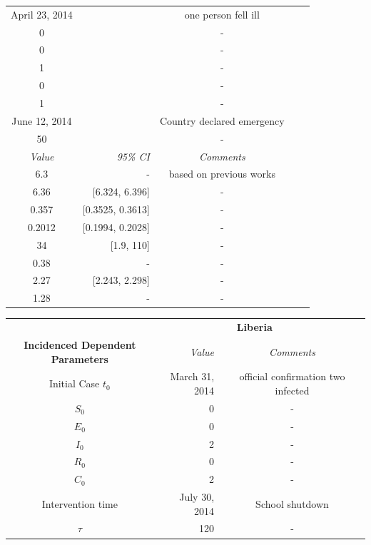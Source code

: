 \documentclass[10pt, journal,onecolumn]{IEEEtran}
\newcommand{\ra}[1]{\renewcommand{\arraystretch}{#1}}
\begin{document}
\begin{appendix}
\begin{table}[h]
{\begin{tabular}{@{}crccc@{}}
\cmidrule{1-3}
April 23, 2014 &  & one person fell ill \cite{}\\
0& & -\\
0& & -\\
1& & -\\
0& & -\\
1& &-\\
June 12, 2014 &  & Country declared emergency\\
50 & & -\\
\cmidrule{1-3}
\textit{Value} & \textit{95\% CI} & \textit{Comments} \\
\midrule
6.3 & - & based on previous works \cite{}\\
6.36 & [6.324, 6.396] & -\\
0.357 & [0.3525, 0.3613] & -\\
0.2012 & [0.1994, 0.2028] & -\\
34 & [1.9, 110] & -\\
0.38 & - & -\\
2.27 &[2.243, 2.298] &-\\
1.28 & - &-\\
\end{tabular}
}
\end{table}
\begin{table}
\centering
\tiny
\parbox{.55\linewidth}{\centering
\ra{1.3}
\begin{tabular}{@{}crccc@{}}%
& \multicolumn{3}{c}{\textbf{Liberia}} &  \\
\cmidrule{2-4}
\textbf{Incidenced Dependent Parameters} & \textit{Value} && \textit{Comments} \\
\midrule
Initial Case $t_0$ & March 31, 2014 &  & official confirmation two infected \cite{}\\
$S_0$ & 0& & -\\
$E_0$ & 0& & -\\
$I_0$ & 2& & -\\
$R_0$ & 0& & -\\
$C_0$ & 2& &-\\
Intervention time & July 30, 2014 &  & School shutdown\\
$\tau$ &120 & & -\\
\midrule

\end{tabular}}
\end{table}
\end{appendix}
\end{document}
